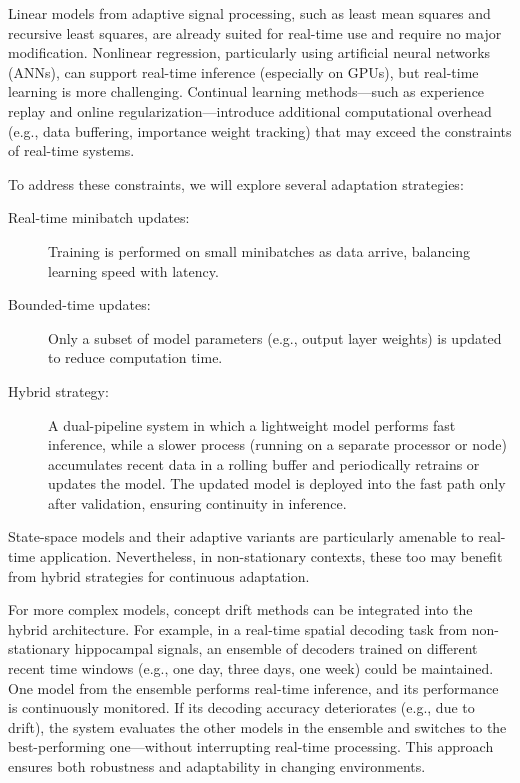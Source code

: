Linear models from adaptive signal processing, such as least mean squares and recursive least squares, are already suited for real-time use and require no major modification. Nonlinear regression, particularly using artificial neural networks (ANNs), can support real-time inference (especially on GPUs), but real-time learning is more challenging. Continual learning methods—such as experience replay and online regularization—introduce additional computational overhead (e.g., data buffering, importance weight tracking) that may exceed the constraints of real-time systems.

To address these constraints, we will explore several adaptation strategies:

\begin{description}
    \item[Real-time minibatch updates:] Training is performed on small minibatches as data arrive, balancing learning speed with latency.
    \item[Bounded-time updates:] Only a subset of model parameters (e.g., output layer weights) is updated to reduce computation time.
    \item[Hybrid strategy:] A dual-pipeline system in which a lightweight model performs fast inference, while a slower process (running on a separate processor or node) accumulates recent data in a rolling buffer and periodically retrains or updates the model. The updated model is deployed into the fast path only after validation, ensuring continuity in inference.
\end{description}

State-space models and their adaptive variants are particularly amenable to real-time application. Nevertheless, in non-stationary contexts, these too may benefit from hybrid strategies for continuous adaptation.

For more complex models, concept drift methods can be integrated into the hybrid architecture. For example, in a real-time spatial decoding task from non-stationary hippocampal signals, an ensemble of decoders trained on different recent time windows (e.g., one day, three days, one week) could be maintained. One model from the ensemble performs real-time inference, and its performance is continuously monitored. If its decoding accuracy deteriorates (e.g., due to drift), the system evaluates the other models in the ensemble and switches to the best-performing one—without interrupting real-time processing. This approach ensures both robustness and adaptability in changing environments.

